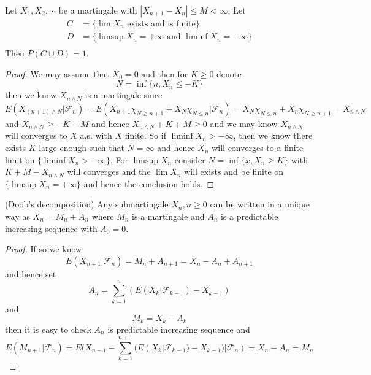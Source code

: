 \documentclass[lang=en, color=blue, ]{elegantbook}
\newcommand{\F}{\mathcal{F}}
\begin{document}
\begin{theorem}
Let $X_1,X_2,\cdots$ be a martingale with $|X_{n+1}-X_n| \leq M < \infty$. Let
\[
\begin{aligned}
    C &= \{\lim X_n\text{ exists and is finite}\} \\
    D &= \{\limsup X_n = +\infty\text{ and }\liminf X_n = -\infty\} \\
\end{aligned}
\]
Then $P(C\cup D) = 1$.
\end{theorem}
\begin{proof}
    We may assume that $X_0 = 0$ and then for $K\geq 0$ denote
    \[
    N = \inf\{n,X_n \leq - K\}
    \]
    then we know $X_{n\wedge N}$ is a martingale since
    \[
    E(X_{(n+1)\wedge N}|\F_n) = E(X_{n+1}\chi_{N \geq n+1}+X_{N}\chi_{N\leq n}|\F_n) = X_{N}\chi_{N\leq n} + X_n\chi_{N\geq n+1} = X_{n\wedge N}
    \]
    and $X_{n\wedge N} \geq -K-M$ and hence $X_{n\wedge N} + K +M \geq 0$ and we may know $X_{n\wedge N}$ will converges to $X$ a.s. with $X$ finite. So if $\liminf X_n > -\infty$, then we know there exists $K$ large enough such that $N = \infty$ and hence $X_n$ will converges to a finite limit on $\{\liminf X_n > -\infty\}$. For $\limsup X_n$ consider $N = \inf\{x, X_n \geq K\}$ with $K+M - X_{n\wedge N}$ will converges and the $\lim X_n$ will exists and be finite on $\{\limsup X_n = +\infty\}$ and hence the conclusion holds.
\end{proof}

\begin{theorem}
    (Doob's decomposition) Any submartingale $X_n, n\geq 0$ can be written in a unique way as $X_n = M_n + A_n$ where $M_n$ is a martingale and $A_n$ is a predictable increasing sequence with $A_0 = 0$.    
\end{theorem}
\begin{proof}
    If so we know
    \[
    E(X_{n+1}|\F_n) = M_n + A_{n+1} = X_n - A_n + A_{n+1}
    \]
    and hence set
    \[
    A_n = \sum\limits_{k=1}^{n} (E(X_{k}|\F_{k-1})-X_{k-1})
    \]
    and
    \[
    M_k = X_k - A_k
    \]
    then it is easy to check $A_n$ is predictable increasing sequence and
    \[
    E(M_{n+1}|\F_n) = E(X_{n+1}-\sum\limits_{k=1}^{n+1} (E(X_{k}|\F_{k-1})-X_{k-1})|\F_n) = X_n - A_n
    = M_n
    \]
\end{proof}
\end{document}
